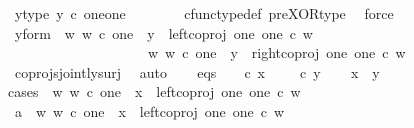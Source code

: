 \begin{isabellebody}
\ y{\isacharunderscore}{\kern0pt}type{\isacharcolon}{\kern0pt}\ {\isachardoublequoteopen}y\ {\isasymin}\isactrlsub c\ one{\isasymCoprod}one{\isachardoublequoteclose}\ \ \isanewline
\ \ \ \ \isamarkupfalse%
\ cfunc{\isacharunderscore}{\kern0pt}type{\isacharunderscore}{\kern0pt}def\ pre{\isacharunderscore}{\kern0pt}XOR{\isacharunderscore}{\kern0pt}type\ \isamarkupfalse%
\ force\isanewline
\ \ \isamarkupfalse%
\ \isamarkupfalse%
\ y{\isacharunderscore}{\kern0pt}form{\isacharcolon}{\kern0pt}\ {\isachardoublequoteopen}{\isacharparenleft}{\kern0pt}{\isasymexists}\ w{\isachardot}{\kern0pt}\ w\ {\isasymin}\isactrlsub c\ one\ {\isasymand}\ y\ {\isacharequal}{\kern0pt}\ left{\isacharunderscore}{\kern0pt}coproj\ one\ one\ {\isasymcirc}\isactrlsub c\ w{\isacharparenright}{\kern0pt}\isanewline
\ \ \ \ \ \ \ \ \ \ \ \ \ \ \ \ \ {\isasymor}\ \ {\isacharparenleft}{\kern0pt}{\isasymexists}\ w{\isachardot}{\kern0pt}\ w\ {\isasymin}\isactrlsub c\ one\ {\isasymand}\ y\ {\isacharequal}{\kern0pt}\ right{\isacharunderscore}{\kern0pt}coproj\ one\ one\ {\isasymcirc}\isactrlsub c\ w{\isacharparenright}{\kern0pt}{\isachardoublequoteclose}\isanewline
\ \ \ \ \isamarkupfalse%
\ coprojs{\isacharunderscore}{\kern0pt}jointly{\isacharunderscore}{\kern0pt}surj\ \isamarkupfalse%
\ auto\isanewline
\isanewline
\ \ \isamarkupfalse%
\ eqs{\isacharcolon}{\kern0pt}\ {\isachardoublequoteopen}{\isasymlangle}{\isasymt}{\isacharcomma}{\kern0pt}{\isasymf}{\isasymrangle}\ {\isasymamalg}\ {\isasymlangle}{\isasymf}{\isacharcomma}{\kern0pt}{\isasymt}{\isasymrangle}\ {\isasymcirc}\isactrlsub c\ x\ {\isacharequal}{\kern0pt}\ {\isasymlangle}{\isasymt}{\isacharcomma}{\kern0pt}{\isasymf}{\isasymrangle}\ {\isasymamalg}\ {\isasymlangle}{\isasymf}{\isacharcomma}{\kern0pt}{\isasymt}{\isasymrangle}\ {\isasymcirc}\isactrlsub c\ y{\isachardoublequoteclose}\isanewline
\isanewline
\ \ \isamarkupfalse%
\ {\isachardoublequoteopen}x\ {\isacharequal}{\kern0pt}\ y{\isachardoublequoteclose}\isanewline
\ \ \isamarkupfalse%
{\isacharparenleft}{\kern0pt}cases\ {\isachardoublequoteopen}{\isasymexists}\ w{\isachardot}{\kern0pt}\ w\ {\isasymin}\isactrlsub c\ one\ {\isasymand}\ x\ {\isacharequal}{\kern0pt}\ left{\isacharunderscore}{\kern0pt}coproj\ one\ one\ {\isasymcirc}\isactrlsub c\ w{\isachardoublequoteclose}{\isacharparenright}{\kern0pt}\isanewline
\ \ \ \ \isamarkupfalse%
\ a{}{\isacharcolon}{\kern0pt}\ {\isachardoublequoteopen}{\isasymexists}\ w{\isachardot}{\kern0pt}\ w\ {\isasymin}\isactrlsub c\ one\ {\isasymand}\ x\ {\isacharequal}{\kern0pt}\ left{\isacharunderscore}{\kern0pt}coproj\ one\ one\ {\isasymcirc}\isactrlsub c\ w{\isachardoublequoteclose}\isanewline

\end{isabellebody}
